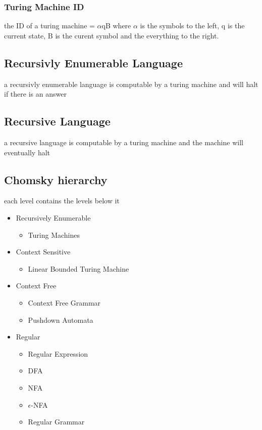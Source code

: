 \documentclass[11pt]{article}
\begin{document}
\subsubsection{Turing Machine ID}
\label{sec-1-8-1}
the ID of a turing machine = $\alpha$qB where $\alpha$ is the symbols to the left, q is the current state, B 
is the curent symbol and the everything to the right.

\subsection{Recursivly Enumerable Language}
\label{sec-1-9}
a recursivly enumerable language is computable by a turing machine and will halt if there is an answer
\subsection{Recursive Language}
\label{sec-1-10}
a recursive language is computable by a turing machine and the machine will eventually halt
\subsection{Chomsky hierarchy}
\label{sec-1-11}
each level contains the levels below it
\begin{itemize}
\item Recursively Enumerable
\begin{itemize}
\item Turing Machines
\end{itemize}
\item Context Sensitive
\begin{itemize}
\item Linear Bounded Turing Machine
\end{itemize}
\item Context Free
\begin{itemize}
\item Context Free Grammar
\item Pushdown Automata
\end{itemize}
\item Regular
\begin{itemize}
\item Regular Expression
\item DFA
\item NFA
\item $\epsilon$-NFA
\item Regular Grammar
\end{itemize}
\end{itemize}
\end{document}
